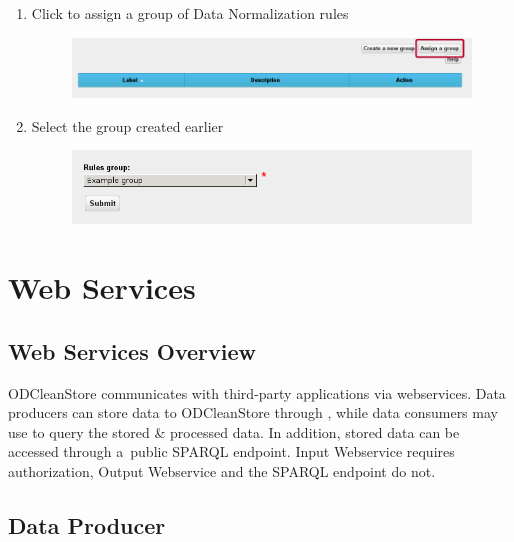 \begin{enumerate}[resume]
	\item Click  to assign a group of Data Normalization rules

\begin{figure}[!h]
    \centering
    \includegraphics[width=\textwidth]{images/fe-walkthrough-assign-group.png}
	\label{fig:feWTAssignGroup}
\end{figure}

	\item Select the group created earlier

\begin{figure}[!h]
    \centering
    \includegraphics[width=\textwidth]{images/fe-walkthrough-new-group-assignment.png}
	\label{fig:feWTNewGroupAssignment}
\end{figure}
	
\end{enumerate}


\chapter{Web Services}
\section{Web Services Overview}
ODCleanStore communicates with third-party applications via webservices. Data producers can store data to ODCleanStore through , while data consumers may use  to query the stored \& processed data. In addition, stored data can be accessed through a~public SPARQL endpoint. Input Webservice requires authorization, Output Webservice and the SPARQL endpoint do not.

\section{Data Producer}
\label{sec:inputWS}

